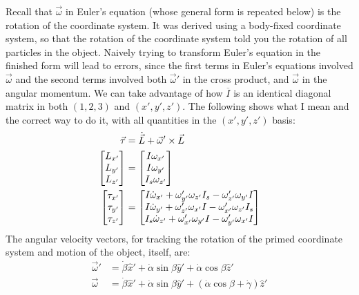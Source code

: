 \documentclass[10pt]{article}
\begin{document}
Recall that $\vec{\omega}$ in Euler's equation (whose general form is 
repeated below) is the 
rotation of the coordinate system. It was derived using a body-fixed coordinate 
system, so that the rotation of the coordinate system told you the 
rotation of all particles in the object. Naively trying to transform Euler's 
equation in the finished form will lead to errors, since the first terms 
in Euler's equations involved $\vec{\omega}$ and the second terms 
involved both $\vec{\omega}'$ in the cross product, and $\vec{\omega}$ 
in the angular momentum. We can take advantage of how 
$\overline{I}$ is an identical diagonal matrix in both $(1,2,3)$ and 
$(x',y',z')$. The following shows what I mean and the 
correct way to do it, with all quantities in the $(x',y',z')$ basis:
\begin{align}
    \vec{\tau} &= \dot{\vec{L}} +\vec{\omega}'\times\vec{L} \notag\\
    \begin{bmatrix}
        L_{x'} \\
        L_{y'} \\
        L_{z'}
    \end{bmatrix}
    &= 
    \begin{bmatrix}
        I\omega_{x'} \\
        I\omega_{y'} \\
        I_s\omega_{z'}
    \end{bmatrix}
    \notag\\
    \begin{bmatrix}
        \tau_{x'} \\
        \tau_{y'} \\
        \tau_{z'}
    \end{bmatrix}
    &=
    \begin{bmatrix}
        I\dot{\omega}_{x'}+\omega'_{y'}\omega_{z'}I_s-\omega'_{z'}\omega_{y'}I\\
        I\dot{\omega}_{y'}+\omega'_{z'}\omega_{x'}I-\omega'_{x'}\omega_{z'}I_s\\
        I_s\dot{\omega}_{z'}+\omega'_{x'}\omega_{y'}I-\omega'_{y'}\omega_{x'}I
    \end{bmatrix}
\end{align}
The angular velocity vectors, for tracking the rotation of the 
primed coordinate system and motion of the object, itself, are:
\begin{align}
    \vec\omega' &= \dot\beta\hat{x}'+\dot\alpha\sin\beta\hat{y}'
        +\dot\alpha\cos\beta\hat{z}' \\
    \vec\omega &= \dot\beta\hat{x}'+\dot\alpha\sin\beta\hat{y}'
        +(\dot\alpha\cos\beta+\dot\gamma)\hat{z}' 
\end{align}
\end{document}
